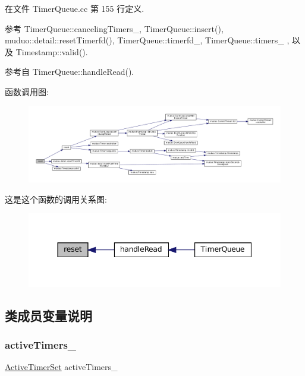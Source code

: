 在文件 Timer\+Queue.\+cc 第 155 行定义.



参考 Timer\+Queue\+::canceling\+Timers\+\_\+, Timer\+Queue\+::insert(), muduo\+::detail\+::reset\+Timerfd(), Timer\+Queue\+::timerfd\+\_\+, Timer\+Queue\+::timers\+\_\+ , 以及 Timestamp\+::valid().



参考自 Timer\+Queue\+::handle\+Read().

函数调用图\+:
\nopagebreak
\begin{figure}[H]
\begin{center}
\leavevmode
\includegraphics[width=350pt]{classmuduo_1_1TimerQueue_ac59fd8ddc045aae320982a0913993237_cgraph}
\end{center}
\end{figure}
这是这个函数的调用关系图\+:
\nopagebreak
\begin{figure}[H]
\begin{center}
\leavevmode
\includegraphics[width=344pt]{classmuduo_1_1TimerQueue_ac59fd8ddc045aae320982a0913993237_icgraph}
\end{center}
\end{figure}


\subsection{类成员变量说明}
\mbox{\label{classmuduo_1_1TimerQueue_a72047415bfa49f1d3d949115c01479fc}} 
\subsubsection{\texorpdfstring{active\+Timers\+\_\+}{activeTimers\_}}
{\footnotesize\ttfamily \hyperlink{classmuduo_1_1TimerQueue_ac4562f9443eea7ea7d16c2eab2dad988}{Active\+Timer\+Set} active\+Timers\+\_\+\hspace{0.3cm}{\ttfamily [private]}}



